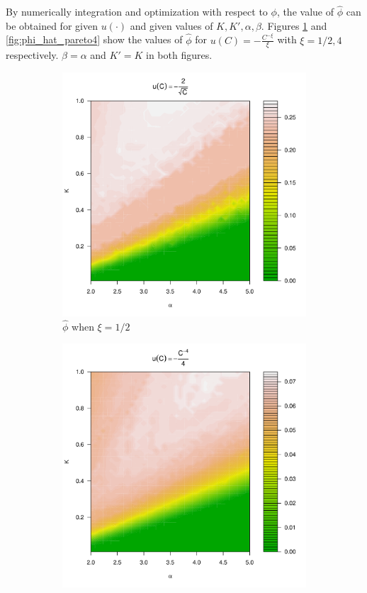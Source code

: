 \documentclass{article}
\begin{document}
By numerically integration and optimization with respect to $\phi$,
the value of $\hat\phi$ can be obtained for given $u(\cdot)$ and given
values of $K, K', \alpha, \beta$. Figures \ref{fig:phi_hat_pareto5e-1}
and \ref{fig:phi_hat_pareto4} show the values of $\hat\phi$ for
$u(C) = -\frac{C^{-\xi}}{\xi}$ with $\xi = 1/2, 4$ respectively.
$\beta=\alpha$ and $K'=K$ in both figures.
\begin{figure}
  \begin{subfigure}[b]{0.5\linewidth}
    \includegraphics[width=\textwidth]{phi_hat_pareto5e-1.pdf}
    \caption{$\hat\phi$ when $\xi = 1/2$}
    \label{fig:phi_hat_pareto5e-1}
  \end{subfigure}
  \begin{subfigure}[b]{0.5\linewidth}
    \includegraphics[width=\textwidth]{phi_hat_pareto4.pdf}

\end{subfigure}
\end{figure}
\end{document}
